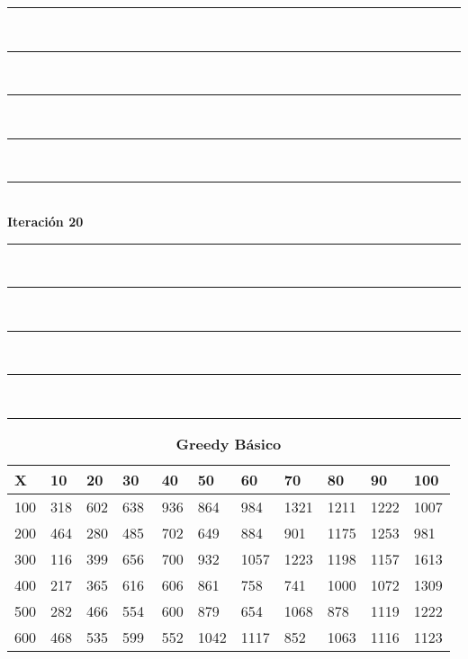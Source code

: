 \documentclass[10pt,letterpaper]{article}
\begin{document}
\newpage 
\begin{center}
\newcommand{\HRule}{\rule{\linewidth}{0.5mm}}
\center
\HRule\\[6cm]
\HRule\\[0.4cm]
\HRule\\[0.4cm]
\HRule\\[0.4cm]
\HRule\\[0.4cm]
{\centering \Huge\bfseries Iteración 20}\\[0.4cm]
\HRule\\[0.4cm]
\HRule\\[0.4cm]
\HRule\\[0.4cm]
\HRule\\[6cm]
\HRule
\end{center}
\newpage 
{}
\begin{center}
\begin{table}\renewcommand{\arraystretch}{2.5}
\caption{\large \textbf{Greedy Básico}}
\centering
\begin{tabular} { |m{0.5cm}|m{1.3cm}|m{1.3cm}|m{1.3cm}|m{1.3cm}|m{1.3cm}|m{1.3cm}|m{1.3cm}|m{1.3cm}|m{1.3cm}|m{1.3cm}|} 
\hline
\rowcolor{Gray}
\centering \textbf{X} & \centering \textbf{10} & \centering \textbf{20} & \centering \textbf{30}\ & \centering \textbf{40} & \centering \textbf{50} & \centering \textbf{60}\ & \centering \textbf{70} & \centering \textbf{80} & \centering \textbf{90}\ & \textbf{100} \\\hline
\cellcolor{Gray}100 & \Large 318 & \Large 602 & \Large 638 & \Large 936 & \Large 864 & \Large 984 & \Large 1321 & \Large 1211 & \Large 1222 & \Large 1007 \\
\hline
\cellcolor{Gray}200 & \Large 464 & \Large 280 & \Large 485 & \Large 702 & \Large 649 & \Large 884 & \Large 901 & \Large 1175 & \Large 1253 & \Large 981 \\
\hline
\cellcolor{Gray}300 & \Large 116 & \Large 399 & \Large 656 & \Large 700 & \Large 932 & \Large 1057 & \Large 1223 & \Large 1198 & \Large 1157 & \Large 1613 \\
\hline
\cellcolor{Gray}400 & \Large 217 & \Large 365 & \Large 616 & \Large 606 & \Large 861 & \Large 758 & \Large 741 & \Large 1000 & \Large 1072 & \Large 1309 \\
\hline
\cellcolor{Gray}500 & \Large 282 & \Large 466 & \Large 554 & \Large 600 & \Large 879 & \Large 654 & \Large 1068 & \Large 878 & \Large 1119 & \Large 1222 \\
\hline
\cellcolor{Gray}600 & \Large 468 & \Large 535 & \Large 599 & \Large 552 & \Large 1042 & \Large 1117 & \Large 852 & \Large 1063 & \Large 1116 & \Large 1123 \\

\end{tabular}
\end{table}
\end{center}
\end{document}

